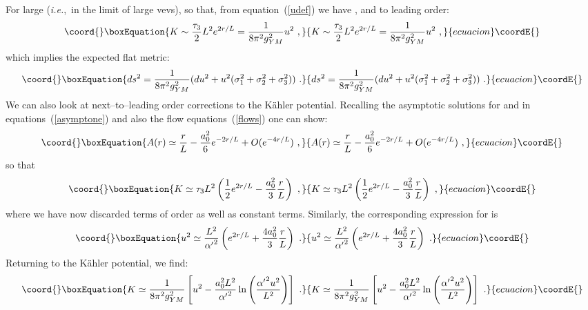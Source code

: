\documentclass[a4paper,12pt]{article}
\providecommand{\reef}[1]{(\ref{#1})}
\begin{document}
For large \coordHE{} ({\it i.e.},~in the limit of large vevs), \coordHE{}
so that, from equation~\reef{udef} we have \coordHE{}, and to leading order:
\begin{equation}\coord{}\boxEquation{
  K \sim \frac{\tau_3}{2} L^2 e^{2r/L} = \frac{1}{8 \pi^2 g_{YM}^2} u^2\ ,
}{
  K \sim \frac{\tau_3}{2} L^2 e^{2r/L} = \frac{1}{8 \pi^2 g_{YM}^2} u^2\ ,
}{ecuacion}\coordE{}\end{equation}
%
which implies the expected flat metric:
\begin{equation}\coord{}\boxEquation{
  ds^2 = \frac{1}{8 \pi^2 g_{YM}^2} (du^2 + u^2 (\sigma_1^2 + \sigma_2^2 + \sigma_3^2))\ .
}{
  ds^2 = \frac{1}{8 \pi^2 g_{YM}^2} (du^2 + u^2 (\sigma_1^2 + \sigma_2^2 + \sigma_3^2))\ .
}{ecuacion}\coordE{}\end{equation}
%
We can also look at next--to--leading order corrections to the
K\"ahler potential.  Recalling the asymptotic solutions for \myHighlight{$\alpha$}\coordHE{}
and \myHighlight{$\chi$}\coordHE{} in equations~\reef{asymptone} and also the flow
equations~\reef{flows} one can show:
\begin{equation}\coord{}\boxEquation{
  A(r) \simeq \frac{r}{L} - \frac{a_0^2}{6} e^{-2r/L} + O(e^{-4r/L})\ ,
}{
  A(r) \simeq \frac{r}{L} - \frac{a_0^2}{6} e^{-2r/L} + O(e^{-4r/L})\ ,
}{ecuacion}\coordE{}\end{equation}
so that
\begin{equation}\coord{}\boxEquation{
  K \simeq \tau_3 L^2 \left(\frac{1}{2} e^{2r/L} - \frac{a_0^2}{3} \frac{r}{L} \right) \ ,
}{
  K \simeq \tau_3 L^2 \left(\frac{1}{2} e^{2r/L} - \frac{a_0^2}{3} \frac{r}{L} \right) \ ,
}{ecuacion}\coordE{}\end{equation}
where we have now discarded terms of order \coordHE{} as well as
constant terms.  Similarly, the corresponding expression for \coordHE{} is
\begin{equation}\coord{}\boxEquation{
  u^2 \simeq \frac{L^2}{{\alpha'}^2} \left(e^{2r/L} + \frac{4 a_0^2}{3} \frac{r}{L} \right)\ .
}{
  u^2 \simeq \frac{L^2}{{\alpha'}^2} \left(e^{2r/L} + \frac{4 a_0^2}{3} \frac{r}{L} \right)\ .
}{ecuacion}\coordE{}\end{equation}
%
Returning to the K\"ahler potential, we find:
\begin{equation}\coord{}\boxEquation{
  K \simeq \frac{1}{8 \pi^2 g_{YM}^2} \left[u^2 - \frac{a_0^2 L^2}{{\alpha'}^2} \ln\left(\frac{{\alpha'}^2 u^2}{L^2}\right)\right]\ .
}{
  K \simeq \frac{1}{8 \pi^2 g_{YM}^2} \left[u^2 - \frac{a_0^2 L^2}{{\alpha'}^2} \ln\left(\frac{{\alpha'}^2 u^2}{L^2}\right)\right]\ .
}{ecuacion}\coordE{}\end{equation}
\end{document}
